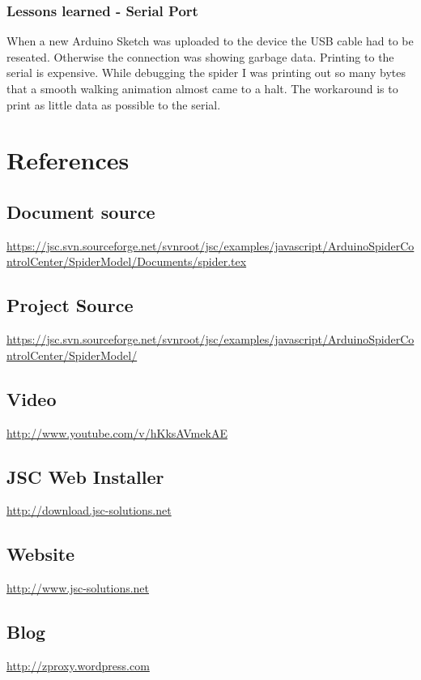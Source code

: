 \documentclass[12pt,leqno]{book}
\begin{document}
\subsection{Lessons learned - Serial Port}

When a new Arduino Sketch was uploaded to the device the USB cable had to be reseated. Otherwise the connection was showing garbage data. Printing to the serial is expensive. While debugging the spider I was printing out so many bytes that a smooth walking animation almost came to a halt. The workaround is to print as little data as possible to the serial.



\chapter{References}

\section{Document source}

\url{https://jsc.svn.sourceforge.net/svnroot/jsc/examples/javascript/ArduinoSpiderControlCenter/SpiderModel/Documents/spider.tex}

\section{Project Source}
\url{https://jsc.svn.sourceforge.net/svnroot/jsc/examples/javascript/ArduinoSpiderControlCenter/SpiderModel/}

\section{Video}
\url{http://www.youtube.com/v/hKksAVmekAE}

\section{JSC Web Installer}
\url{http://download.jsc-solutions.net}

\section{Website}
\url{http://www.jsc-solutions.net}

\section{Blog}
\url{http://zproxy.wordpress.com}
\end{document}
